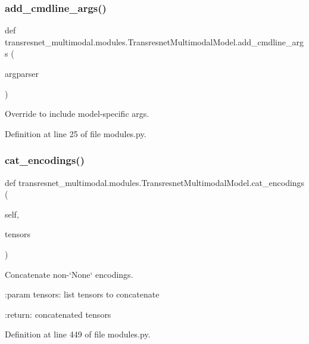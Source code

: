 \subsubsection{\texorpdfstring{add\+\_\+cmdline\+\_\+args()}{add\_cmdline\_args()}}
{\footnotesize\ttfamily def transresnet\+\_\+multimodal.\+modules.\+Transresnet\+Multimodal\+Model.\+add\+\_\+cmdline\+\_\+args (\begin{DoxyParamCaption}\item[{}]{argparser }\end{DoxyParamCaption})\hspace{0.3cm}{\ttfamily [static]}}

\begin{DoxyVerb}Override to include model-specific args.\end{DoxyVerb}
 

Definition at line 25 of file modules.\+py.

\mbox{\label{classtransresnet__multimodal_1_1modules_1_1TransresnetMultimodalModel_ae3bbb2a16a997364f8a097459a8e8562}} 
\subsubsection{\texorpdfstring{cat\+\_\+encodings()}{cat\_encodings()}}
{\footnotesize\ttfamily def transresnet\+\_\+multimodal.\+modules.\+Transresnet\+Multimodal\+Model.\+cat\+\_\+encodings (\begin{DoxyParamCaption}\item[{}]{self,  }\item[{}]{tensors }\end{DoxyParamCaption})}

\begin{DoxyVerb}Concatenate non-`None` encodings.

:param tensors:
    list tensors to concatenate

:return:
    concatenated tensors
\end{DoxyVerb}
 

Definition at line 449 of file modules.\+py.



